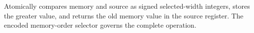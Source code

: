 Atomically compares memory and source as signed selected-width integers, stores the greater value, and returns the
old memory value in the source register. The encoded memory-order selector governs the complete operation.
